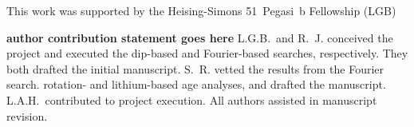 \documentclass[11pt,twocolumn,tighten]{aastex63}
\begin{document}
\acknowledgments
This work was supported by the 
Heising-Simons 51~Pegasi~b Fellowship (LGB)

{\bf author contribution statement goes here}
L.G.B.~and R.~J. conceived the project and executed the
dip-based and Fourier-based searches, respectively.
They both drafted the initial manuscript.
S.~R. vetted the results from the Fourier search.
rotation- and lithium-based age analyses, and drafted the manuscript.
L.A.H.~contributed to project execution.
All authors assisted in manuscript revision.


\ 
\end{document}
